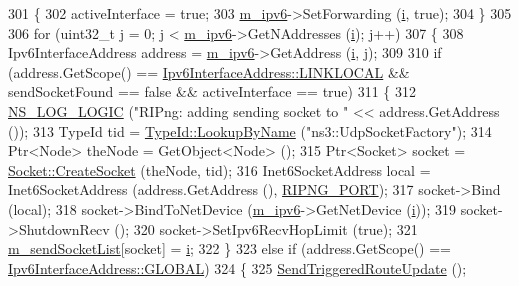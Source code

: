 \begin{DoxyCode}
301     \{
302       activeInterface = \textcolor{keyword}{true};
303       \hyperlink{classns3_1_1RipNg_aca7a023799ce2004499a826ba5d5d3fe}{m\_ipv6}->SetForwarding (\hyperlink{bernuolliDistribution_8m_a6f6ccfcf58b31cb6412107d9d5281426}{i}, \textcolor{keyword}{true});
304     \}
305 
306   \textcolor{keywordflow}{for} (uint32\_t j = 0; j < \hyperlink{classns3_1_1RipNg_aca7a023799ce2004499a826ba5d5d3fe}{m\_ipv6}->GetNAddresses (\hyperlink{bernuolliDistribution_8m_a6f6ccfcf58b31cb6412107d9d5281426}{i}); j++)
307     \{
308       Ipv6InterfaceAddress address = \hyperlink{classns3_1_1RipNg_aca7a023799ce2004499a826ba5d5d3fe}{m\_ipv6}->GetAddress (\hyperlink{bernuolliDistribution_8m_a6f6ccfcf58b31cb6412107d9d5281426}{i}, j);
309 
310       \textcolor{keywordflow}{if} (address.GetScope() == \hyperlink{classns3_1_1Ipv6InterfaceAddress_ad3f03debf9dae475b81ea9cdf81f4f27a29f5cd6ebe813216f28d906d89d4c56d}{Ipv6InterfaceAddress::LINKLOCAL} && 
      sendSocketFound == \textcolor{keyword}{false} && activeInterface == \textcolor{keyword}{true})
311         \{
312           \hyperlink{group__logging_ga88acd260151caf2db9c0fc84997f45ce}{NS\_LOG\_LOGIC} (\textcolor{stringliteral}{"RIPng: adding sending socket to "} << address.GetAddress ());
313           TypeId tid = \hyperlink{classns3_1_1TypeId_a119cf99c20931fdc294602cd360b180e}{TypeId::LookupByName} (\textcolor{stringliteral}{"ns3::UdpSocketFactory"});
314           Ptr<Node> theNode = GetObject<Node> ();
315           Ptr<Socket> socket = \hyperlink{classns3_1_1Socket_ad448a62bb50ad3dbac59c879a885a8d2}{Socket::CreateSocket} (theNode, tid);
316           Inet6SocketAddress local = Inet6SocketAddress (address.GetAddress (), 
      \hyperlink{ripng_8cc_a86ce7fe00a995035f236d2463a7b761f}{RIPNG\_PORT});
317           socket->Bind (local);
318           socket->BindToNetDevice (\hyperlink{classns3_1_1RipNg_aca7a023799ce2004499a826ba5d5d3fe}{m\_ipv6}->GetNetDevice (\hyperlink{bernuolliDistribution_8m_a6f6ccfcf58b31cb6412107d9d5281426}{i}));
319           socket->ShutdownRecv ();
320           socket->SetIpv6RecvHopLimit (\textcolor{keyword}{true});
321           \hyperlink{classns3_1_1RipNg_a761d304dc3d34cd528afe87c5fa8090b}{m\_sendSocketList}[socket] = \hyperlink{bernuolliDistribution_8m_a6f6ccfcf58b31cb6412107d9d5281426}{i};
322         \}
323       \textcolor{keywordflow}{else} \textcolor{keywordflow}{if} (address.GetScope() == \hyperlink{classns3_1_1Ipv6InterfaceAddress_ad3f03debf9dae475b81ea9cdf81f4f27aaf504a3b8c1562206e6ba65b4a6cff1d}{Ipv6InterfaceAddress::GLOBAL})
324         \{
325           \hyperlink{classns3_1_1RipNg_ad7a8e445116b3dd8cdd1d50366787c66}{SendTriggeredRouteUpdate} ();

\end{DoxyCode}

